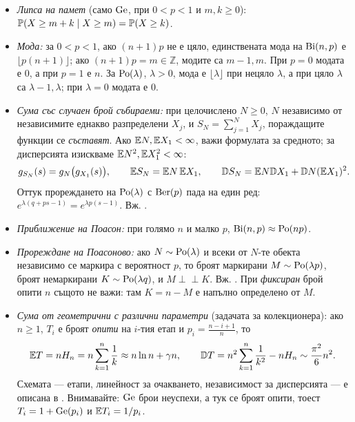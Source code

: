 \begin{itemize}\itemsep2pt
  \item \emph{Липса на памет} (само $\operatorname{Ge}$, при $0<p<1$ и $m,k\ge0$):
        $\mathbb{P}(X \ge m+k \mid X \ge m) = \mathbb{P}(X \ge k)$.
  \item \emph{Мода:} за $0<p<1$, ако $(n+1)p$ не е цяло, единствената мода на $\operatorname{Bi}(n,p)$ е
        $\lfloor p(n+1)\rfloor$; ако $(n+1)p=m\in\mathbb Z$, модите са $m-1,m$.
        При $p=0$ модата е $0$, а при $p=1$ е $n$. За $\operatorname{Po}(\lambda)$,
        $\lambda>0$, мода е $\lfloor\lambda\rfloor$ при нецяло $\lambda$, а при
        цяло $\lambda$ са $\lambda-1,\lambda$; при $\lambda=0$ модата е $0$.
  \item \emph{Сума със случаен брой събираеми:} при целочислено $N\ge0$, $N$ независимо
        от независимите еднакво разпределени $X_j$, и $S_N = \sum_{j=1}^N X_j$,
        пораждащите функции се \emph{съставят}. Ако $\mathbb{E} N,\mathbb{E} X_1<\infty$, важи
        формулата за средното; за дисперсията изискваме
        $\mathbb{E} N^2,\mathbb{E} X_1^2<\infty$:
        \[ g_{S_N}(s) = g_N\big(g_{X_1}(s)\big), \qquad
           \mathbb{E} S_N = \mathbb{E} N\,\mathbb{E} X_1, \qquad
           \mathbb{D} S_N = \mathbb{E} N \mathbb{D} X_1 + \mathbb{D} N (\mathbb{E} X_1)^2 . \]
        Оттук прореждането на $\operatorname{Po}(\lambda)$ с $\operatorname{Ber}(p)$ пада на един ред:
        $e^{\lambda(q+ps-1)} = e^{\lambda p(s-1)}$. Вж.
        .
  \item \emph{Приближение на Поасон:} при голямо $n$ и малко $p$, $\operatorname{Bi}(n,p) \approx \operatorname{Po}(np)$.
  \item \emph{Прореждане на Поасоново:} ако $N \sim \operatorname{Po}(\lambda)$ и всеки от $N$-те обекта
        независимо се маркира с вероятност $p$, то броят маркирани $M \sim \operatorname{Po}(\lambda p)$,
        броят немаркирани $K \sim \operatorname{Po}(\lambda q)$, и $M \perp\!\!\!\perp K$. Вж.
        . При \emph{фиксиран} брой
        опити $n$ същото не важи: там $K = n - M$ е напълно определено от $M$.
  \item \emph{Сума от геометрични с различни параметри} (задачата за колекционера): ако
        $n\ge1$, $T_i$ е броят \emph{опити} на $i$-тия етап и $p_i = \frac{n-i+1}{n}$,
        то
        \[ \mathbb{E} T = n H_n = n\sum_{k=1}^{n}\frac1k \approx n\ln n + \gamma n, \qquad
           \mathbb{D} T = n^2\sum_{k=1}^{n}\frac{1}{k^2} - n H_n
           \sim \frac{\pi^2}{6}n^2 . \]
        Схемата — етапи, линейност за очакването, независимост за дисперсията — е описана
        в . Внимавайте: $\operatorname{Ge}$ брои
        неуспехи, а тук се броят опити, тоест $T_i = 1 + \operatorname{Ge}(p_i)$ и $\mathbb{E} T_i = 1/p_i$.
\end{itemize}

